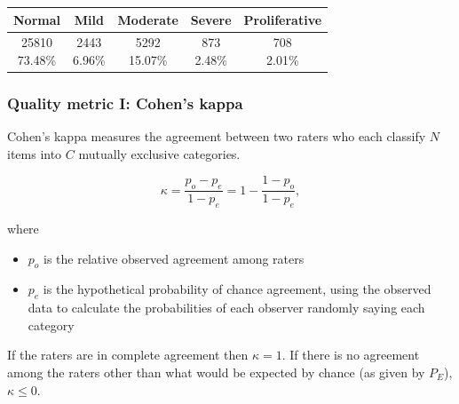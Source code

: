 \begin{frame}
\begin{tabular}{|@{}c@{}|@{}c@{}|@{}c@{}|@{}c@{}|@{}c@{}|}
Normal & Mild & Moderate & Severe & Proliferative \\

\hline
 \specialcell{25810\\ \footnotesize{73.48\%}}  & 
 \specialcell{2443\\\footnotesize6.96\%} & 
 \specialcell{5292\\\footnotesize15.07\%} & 
 \specialcell{873\\\footnotesize2.48\%} & 
 \specialcell{708\\\footnotesize2.01\%} \\

\hline
\end{tabular}

\end{frame}

\begin{frame}\frametitle{Quality metric I: Cohen's kappa}
\footnotesize
Cohen's kappa measures the agreement between two raters who each classify $N$ items into $C$ mutually exclusive categories. 



\[ \kappa = \frac{p_o - p_e}{1 - p_e} = 1- \frac{1 - p_o}{1 - p_e}, \]

where
\begin{itemize}
\item $p_o$ is the relative observed agreement among raters
\item $p_e$ is the hypothetical probability of chance agreement, using the observed data to calculate the probabilities of each observer randomly saying each category
\end{itemize}

If the raters are in complete agreement then $\kappa = 1$.  If there is no agreement among the raters other than what would be expected by chance (as given by $P_E$), $\kappa \leq 0$.


\end{frame}

